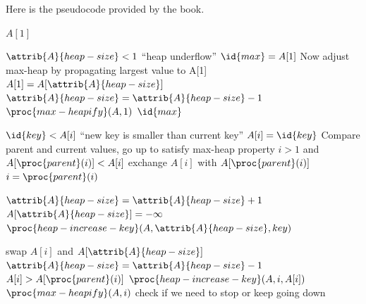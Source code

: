 \documentclass[12pt]{article}
\begin{document}
Here is the pseudocode provided by the book.
\begin{codebox}
\li \Return $A[1]$
\end{codebox}

\begin{codebox}
\li \If $\attrib{A}{heap-size} < 1$
\li \Then
        \Error ``heap underflow''
    \End
\li $\id{max} = A[1]$
\li \Comment Now adjust max-heap by propagating largest value to A[1]
\li $A[1] = A[\attrib{A}{heap-size}]$
\li $\attrib{A}{heap-size} = \attrib{A}{heap-size} - 1$
\li $\proc{max-heapify}(A, 1)$
\li \Return $\id{max}$
\end{codebox}

\begin{codebox}
\li \If $\id{key} < A[i]$
\li \Then
        \Error ``new key is smaller than current key''
    \End
\li $A[i] = \id{key}$
\li \Comment Compare parent and current values, go up to satisfy max-heap property
\li \While $i >  1$ and $A[\proc{parent}(i)] < A[i]$
\li \Do
        exchange $A[i]$ with $A[\proc{parent}(i)]$
\li     $i = \proc{parent}(i)$
    \End
\end{codebox}

\begin{codebox}
\li $\attrib{A}{heap-size} = \attrib{A}{heap-size} + 1$
\li $A[\attrib{A}{heap-size}] = -\infty$
\li $\proc{heap-increase-key}(A, \attrib{A}{heap-size}, key)$
\end{codebox}

\begin{codebox}
\li swap $A[i]$ and $A[\attrib{A}{heap-size}]$
\li $\attrib{A}{heap-size} = \attrib{A}{heap-size} - 1$
\li \If $A[i] > A[\proc{parent}(i)]$
\li \Then
        $\proc{heap-increase-key}(A, i, A[i])$
    \End
\li \Else
\li \Then
        $\proc{max-heapify}(A, i)$ \Comment check if we need to stop or keep going down
    \End
\end{codebox}
\end{document}
